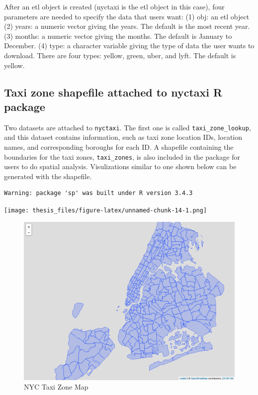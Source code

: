 \documentclass[12pt,twoside]{reedthesis}
\theoremstyle{definition}
\theoremstyle{definition}
\theoremstyle{definition}
\theoremstyle{remark}
\begin{document}
After an etl object is created (nyctaxi is the etl object in this case),
four parameters are needed to specify the data that users want: (1) obj:
an etl object (2) years: a numeric vector giving the years. The default
is the most recent year. (3) months: a numeric vector giving the months.
The default is January to December. (4) type: a character variable
giving the type of data the user wants to download. There are four
types: yellow, green, uber, and lyft. The default is yellow.

\subsection{Taxi zone shapefile attached to nyctaxi R
package}\label{taxi-zone-shapefile-attached-to-nyctaxi-r-package}

Two datasets are attached to \texttt{nyctaxi}. The first one is called
\texttt{taxi\_zone\_lookup}, and this dataset contains information, such
as taxi zone location IDs, location names, and corresponding boroughs
for each ID. A shapefile containing the boundaries for the taxi zones,
\texttt{taxi\_zones}, is also included in the package for users to do
spatial analysis. Visulizations similar to one shown below can be
generated with the shapefile.
\begin{verbatim}
Warning: package 'sp' was built under R version 3.4.3
\end{verbatim}
\texttt{[image: thesis\_files/figure-latex/unnamed-chunk-14-1.png]}
\begin{figure}

{\centering \includegraphics[width=4.96in]{figure/zonemap} 

}

\caption{NYC Taxi Zone Map}\label{fig:map}
\end{figure}
\end{document}
